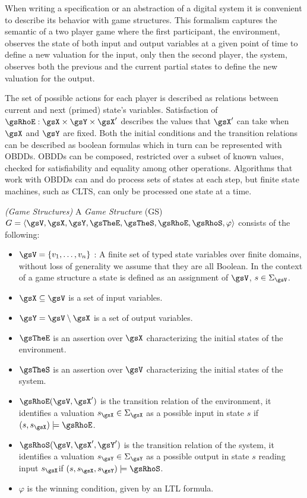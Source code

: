 When writing a specification or an abstraction of a digital system it is convenient to describe its behavior with game structures. This formalism captures the semantic of a two player game where the first participant, the environment, observes the state of both input and output variables at a given point of time to define a new valuation for the input, only then the second player, the system, observes both the previous and the current partial states to define the new valuation for the output. 

The set of possible actions for each player is described as relations between current and next (primed) state's variables. Satisfaction of $\gsRhoE: \gsX \times \gsY \times \gsX'$ describes the values that $\gsX'$ can take when $\gsX$ and $\gsY$ are fixed. Both the initial conditions and the transition relations can be described as boolean formulas which in turn can be represented with OBDDs. OBDDs can be composed, restricted over a subset of known values, checked for satisfiability and equality among other operations. Algorithms that work with OBDDs can and do process sets of states at each step, but finite state machines, such as CLTS, can only be processed one state at a time.

\begin{definition}
	\label{def:GS} \emph{(Game Structures)} 
	A \emph{Game Structure} (GS) $G =  \langle \gsV, \gsX, \gsY, \gsTheE, \gsTheS, \gsRhoE, \gsRhoS, \varphi \rangle$ consists of the following:
	\begin{itemize}
		\item $\gsV = \{v_1,\ldots,v_n\}$ : A finite set of typed state variables over finite domains, without loss of generality we assume that they are all Boolean. In the context of a game structure a state is defined as an assignment of $\gsV$, $s \in \Sigma_{\gsV}$.
		\item $\gsX \subseteq \gsV$ is a set of input variables.
		\item $\gsY = \gsV \setminus \gsX$ is a set of output variables.
		\item $\gsTheE$ is an assertion over $\gsX$ characterizing the initial states of the environment.
		\item $\gsTheS$ is an assertion over $\gsV$ characterizing the initial states of the system.		
		\item $\gsRhoE(\gsV,\gsX')$ is the transition relation of the environment, it identifies a valuation $s_{\gsX} \in \Sigma_{\gsX}$ as a possible input in state $s$ if $(s,s_{\gsX}) \models \gsRhoE$.
		\item $\gsRhoS(\gsV,\gsX',\gsY')$ is the transition relation of the system, it identifies a valuation $s_{\gsY} \in \Sigma_{\gsY}$ as a possible output in state $s$ reading input $s_{\gsX} $if $(s,s_{\gsX}, s_{\gsY}) \models \gsRhoS$.		
		\item $\varphi$ is the winning condition, given by an LTL formula.
	\end{itemize} 
\end{definition}

